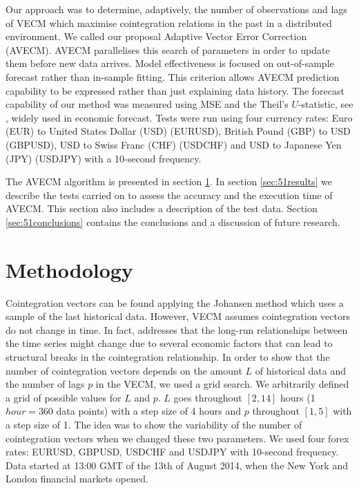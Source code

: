 Our approach was to determine, adaptively, the number of observations and lags of
VECM which maximise cointegration relations in the past in a distributed
environment. We called our proposal Adaptive Vector Error Correction (AVECM). 
AVECM parallelises this search of parameters in order to update them
before new data arrives. Model effectiveness is focused on out-of-sample
forecast rather than in-sample fitting. This criterion allows AVECM prediction
capability to be expressed rather than just explaining data history.  The
forecast capability of our method was measured using MSE and the Theil's
$U$-statistic, see \cite{theil1966}, widely used in economic forecast. Tests
were run using four currency rates: Euro (EUR) to United States Dollar (USD)
(EURUSD), British Pound (GBP) to USD (GBPUSD), USD to Swiss Franc (CHF) (USDCHF)
and USD to Japanese Yen (JPY) (USDJPY) with a 10-second frequency.

The AVECM algorithm is presented in section \ref{sec:51methodology}.
In section \ref{sec:51results} we describe the tests carried on to assess the
accuracy and the execution time of AVECM.  This section also includes a
description of the test data.  Section \ref{sec:51conclusions} contains the
conclusions and a discussion of future research.

\section{Methodology} \label{sec:51methodology}

Cointegration vectors can be found applying the Johansen method which uses a
sample of the last historical data. However, VECM assumes cointegration vectors
do not change in time.  In fact, \cite{gregoryETal1996} addresses that the
long-run relationships between the time series  might change due to several
economic factors that can lead to structural breaks in the cointegration
relationship.  In order to show that the number of cointegration vectors depends
on the amount $L$ of historical data and the number of lags $p$ in the VECM, we
used a grid search.  We arbitrarily defined a grid of possible values for $L$
and $p$. $L$ goes throughout $[2,14]$ hours (1 $hour = 360$ data points) with a
step size of 4 hours and $p$ throughout $[1,5]$ with a step size of 1. The idea
was to show the variability of the number of cointegration vectors when we changed
these two parameters. We used four forex rates: EURUSD, GBPUSD, USDCHF and
USDJPY with 10-second frequency. Data started at 13:00 GMT of the 13th of August
2014, when the New York and London financial markets opened.

